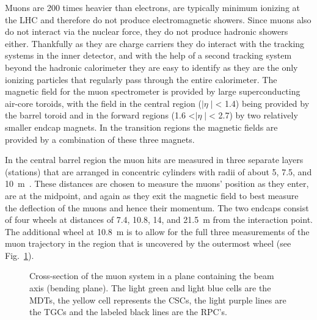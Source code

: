 Muons are 200 times heavier than electrons, are typically minimum ionizing at the LHC and therefore do not produce electromagnetic showers.  
Since muons also do not interact via the nuclear force, they do not produce hadronic showers either.  
Thankfully as they are charge carriers they do interact with the tracking systems in the inner detector, and with the help of a second tracking system beyond the hadronic calorimeter they are easy to identify as they are the only ionizing particles that regularly pass through the entire calorimeter.  
The magnetic field for the muon spectrometer is provided by large superconducting air-core toroids, with the field in the central region ($\mid\eta\mid$< 1.4) being provided by the barrel toroid and in the forward regions (1.6 <$\mid\eta\mid$< 2.7) by two relatively smaller endcap magnets.  
In the transition regions the magnetic fields are provided by a combination of these three magnets.  

In the central barrel region the muon hits are measured in three separate layers (stations) that are arranged in concentric cylinders with radii of about 5, 7.5, and 10~m~\cite{MuonTDR}.  
These distances are chosen to measure the muons' position as they enter, are at the midpoint, and again as they exit the magnetic field to best measure the deflection of the muons and hence their momentum.  
The two endcaps consist of four wheels at distances of 7.4, 10.8, 14, and 21.5~m from the interaction point. 
The additional wheel at 10.8~m is to allow for the full three measurements of the muon trajectory in the region that is uncovered by the outermost wheel (see Fig.~\ref{MuonSpectroFig}).


\begin{figure}[!ht]
  \begin{center}
  \end{center}
  \caption[Muon system cross section.]
      {\small Cross-section of the muon system in a plane containing the beam axis (bending plane).  The light green and light blue cells are the MDTs, the yellow cell represents the CSCs, the light purple lines are the TGCs and the labeled black lines are the RPC's.  }
  \label{MuonSpectroFig}
\end{figure}

